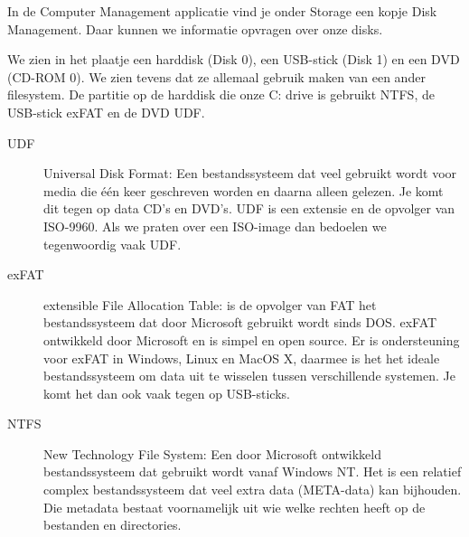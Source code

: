 In de Computer Management applicatie vind je onder Storage een kopje Disk Management. Daar kunnen we informatie opvragen over onze disks.

\begin{minipage}[t]{\linewidth}
\raggedright
{}
\end{minipage}

We zien in het plaatje een harddisk (Disk 0), een USB-stick (Disk 1) en een DVD (CD-ROM 0). We zien tevens dat ze allemaal gebruik maken van een ander filesystem. De partitie op de harddisk die onze C: drive is gebruikt NTFS, de USB-stick exFAT en de DVD UDF.
\begin{description}
\item[UDF] Universal Disk Format: Een bestandssysteem dat veel gebruikt wordt voor media die \'e\'en keer geschreven worden en daarna alleen gelezen. Je komt dit tegen op data CD's en DVD's. UDF is een extensie en de opvolger van ISO-9960. Als we praten over een ISO-image dan bedoelen we tegenwoordig vaak UDF.
\item[exFAT] extensible File Allocation Table: is de opvolger van FAT het bestandssysteem dat door Microsoft gebruikt wordt sinds DOS. exFAT ontwikkeld door Microsoft en is simpel en open source. Er is ondersteuning voor exFAT in Windows, Linux en MacOS X, daarmee is het het ideale bestandssysteem om data uit te wisselen tussen verschillende systemen. Je komt het dan ook vaak tegen op USB-sticks.
\item[NTFS] New Technology File System: Een door Microsoft ontwikkeld bestandssysteem dat gebruikt wordt vanaf Windows NT. Het is een relatief complex bestandssysteem dat veel extra data (META-data) kan bijhouden. Die metadata bestaat voornamelijk uit wie welke rechten heeft op de bestanden en directories.
\end{description}

